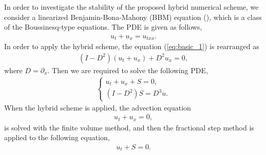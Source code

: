 \documentclass[review]{elsarticle}
\begin{document}
In order to investigate the stability of the proposed hybrid numerical scheme,
we consider a linearized Benjamin-Bona-Mahony (BBM)
equation (\cite{benjamin1972model}),
which is a class of the Boussinesq-type equations. 
The PDE is given as follows,
\begin{align}
u_t + u_x = u_{txx}.
\label{eq:basic_1}
\end{align}
In order to apply the hybrid scheme,
the equation (\ref{eq:basic_1}) is rearranged as
\begin{align}
(I-D^2)(u_t + u_x) +D^2u_x = 0, \label{eq:basic_2}
\end{align}
where $D=\partial_x$.
Then we are required to solve the following PDE,
\begin{align}
\left\{
\begin{array}{l}
u_t + u_x + S = 0, \\
\left(I-D^2 \right)S = D^3 u .
\end{array}
\right.
\end{align}
When the hybrid scheme is applied, the advection equation
\begin{align}
u_t + u_x = 0,
\label{eq:append_advec}
\end{align}
is solved with the finite volume method, 
and then the fractional step method is applied to
the following equation,
\begin{align*}
u_t + S = 0.
\end{align*}
\end{document}
